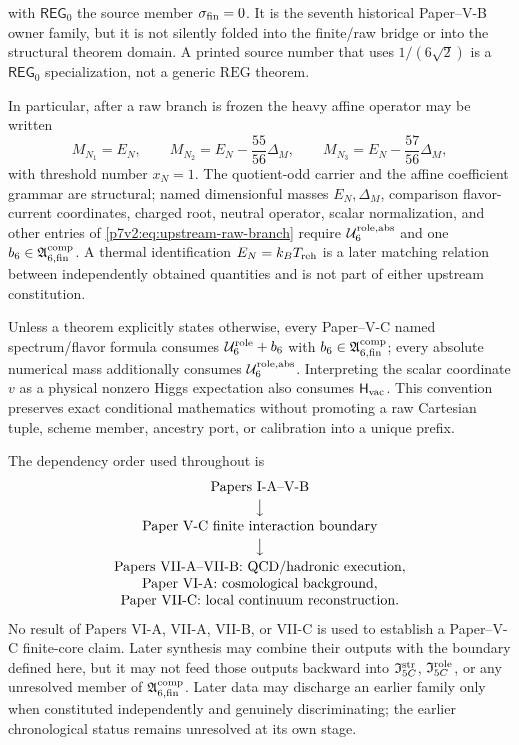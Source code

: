 \documentclass[12pt,a4paper]{article}
\newcommand{\Hvac}{\mathsf{H}_{\rm vac}}
\newcommand{\REGzero}{\mathsf{REG}_{0}}
\newcommand{\Urole}{\mathcal U_6^{\rm role}}
\newcommand{\Uroleabs}{\mathcal U_6^{\rm role,abs}}
\newcommand{\Istr}{\mathfrak I_{5C}^{\rm str}}
\newcommand{\Irole}{\mathfrak I_{5C}^{\rm role}}
\newcommand{\Acompsix}{\mathfrak A_{6,{\rm fin}}^{\rm comp}}
\begin{document}
with \(\REGzero\) the source member \(\sigma_{\rm fin}=0\).  It is the seventh
historical Paper--V-B owner family, but it is not silently folded into the
finite/raw bridge or into the structural theorem domain.  A printed source
number that uses \(1/(6\sqrt2)\) is a \(\REGzero\) specialization, not a
generic \(\mathrm{REG}\) theorem.

In particular, after a raw branch is frozen the heavy affine operator may be
written
\begin{equation}
\label{p7v2:eq:heavy-affine-import}
 M_{N_1}=E_N,\qquad
 M_{N_2}=E_N-\frac{55}{56}\Delta_M,\qquad
 M_{N_3}=E_N-\frac{57}{56}\Delta_M,
\end{equation}
with threshold number \(x_N=1\).  The quotient-odd carrier and the affine
coefficient grammar are structural; named dimensionful masses
\(E_N,\Delta_M\), comparison flavor-current coordinates, charged root, neutral operator, scalar
normalization, and other entries of
\eqref{p7v2:eq:upstream-raw-branch} require \(\Uroleabs\) and one
\(b_6\in\Acompsix\).  A thermal identification
\(E_N=k_BT_{\rm reh}\) is a later matching relation between independently
obtained quantities and is not part of either upstream constitution.

Unless a theorem explicitly states otherwise, every Paper--V-C named
spectrum/flavor formula consumes \(\Urole+b_6\) with
\(b_6\in\Acompsix\); every absolute numerical mass additionally consumes
\(\Uroleabs\).  Interpreting the scalar coordinate \(v\) as a physical
nonzero Higgs expectation also consumes \(\Hvac\).  This convention preserves
exact conditional mathematics without promoting a raw Cartesian tuple,
scheme member, ancestry port, or calibration into a unique prefix.

The dependency order used throughout is
\begin{equation}
\label{p7v2:eq:dependency-order}
 \begin{gathered}
 \text{Papers I-A--V-B}\\[-0.15em]
 \big\downarrow\\[-0.15em]
 \text{Paper V-C finite interaction boundary}\\[-0.15em]
 \big\downarrow\\[-0.15em]
 \begin{array}{c}
   \text{Papers VII-A--VII-B: QCD/hadronic execution},\\
   \text{Paper VI-A: cosmological background},\\
   \text{Paper VII-C: local continuum reconstruction}.
 \end{array}
 \end{gathered}
\end{equation}
No result of Papers VI-A, VII-A, VII-B, or VII-C is used to establish a Paper--V-C
finite-core claim.  Later synthesis may combine their outputs with the boundary
defined here, but it may not feed those outputs backward into \(\Istr\),
\(\Irole\), or any unresolved member of \(\Acompsix\).  Later data may discharge
an earlier family only when constituted independently and genuinely
discriminating; the earlier chronological status remains unresolved at its own
stage.
\end{document}
